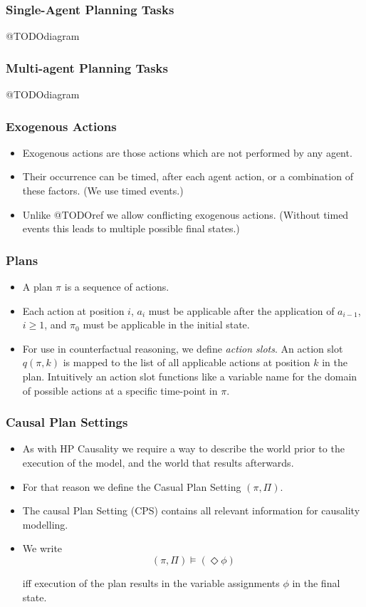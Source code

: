 \documentclass{beamer}
\theoremstyle{plain}
\theoremstyle{definition}
\begin{document}
\begin{frame}
\frametitle{Single-Agent Planning Tasks}
@TODOdiagram

\end{frame}


\begin{frame}
\frametitle{Multi-agent Planning Tasks}
@TODOdiagram

\end{frame}

\begin{frame}
\frametitle{Exogenous Actions}
\begin{itemize}
\item Exogenous actions are those actions which are not performed by any agent.
\item Their occurrence can be timed, after each agent action, or a combination of these factors. (We use timed events.)
\item Unlike @TODOref we allow conflicting exogenous actions. (Without timed events this leads to multiple possible final states.)
\end{itemize}

\end{frame}


\begin{frame}
\frametitle{Plans}
\begin{itemize}
\item A plan $\pi$ is a sequence of actions. 
\item Each action at position $i$, $a_i$ must be applicable after the application of $a_{i-1}$, $i\geq 1$, and $\pi_0$ must be applicable in the initial state.
\item For use in counterfactual reasoning, we define \textit{action slots}. An action slot $q(\pi,k)$ is mapped to the list of all applicable actions at position $k$ in the plan. Intuitively an action slot functions like a variable name for the domain of possible actions at a specific time-point in $\pi$.
\end{itemize}

\end{frame}


\begin{frame}
\frametitle{Causal Plan Settings}
\begin{itemize}
\item As with HP Causality we require a way to describe the world prior to the execution of the model, and the world that results afterwards.
\item For that reason we define the Casual Plan Setting $(\pi, \Pi)$.
\item The causal Plan Setting (CPS) contains all relevant information for causality modelling.
\item We write
\[
(\pi,\Pi)\models (\Diamond \phi)
\]

iff execution of the plan results in the variable assignments $\phi$ in the final state.
\end{itemize}

\end{frame}
\end{document}
